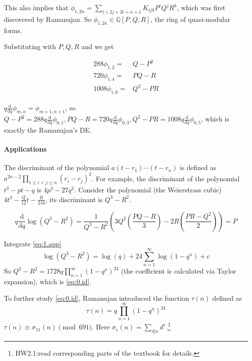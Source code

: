\documentclass{article}
\begin{document}
This also implies that $\phi_{1,2n} = \sum\limits_{i+2j+3l =n+1}^{}K_{ijk}P^iQ^jR^k$, which was first discovered by Ramanujan. So $\phi_{1,2n}\in \mathbb{Q}[P,Q,R]$, the ring of quasi-modular forms.

Substituting with $P,Q,R$ and we get

\begin{align*}
 288 \phi_{1,2} = & Q - P^2\\
 720\phi_{1,4} = & PQ-R\\
 1008 \phi_{1,6} = & Q^2 - PR
\end{align*}

$q \frac{\mathrm{d}}{\mathrm{d}q}\phi_{m,n} = \phi_{m+1,n+1}$, so $Q-P^2 = 288 q \frac{\mathrm{d}}{\mathrm{d}q}\phi_{0,1}, PQ-R = 720 q \frac{\mathrm{d}}{\mathrm{d}q}\phi_{0,3}, Q^2-PR=1008 q \frac{\mathrm{d}}{\mathrm{d}q}\phi_{0,5}$, which is exactly the Ramanujan's DE.

\paragraph{Applications}
The discriminant of the polynomial $a(t-r_1)\cdots (t-r_n)$ is defined as $a^{2n-2}\prod\limits_{1\leq i<j\leq n}(r_i-r_j)^2$. For example, the discriminant of the polynomial  $t^3 - pt - q$ is $4p^3-27q^2$. Consider the polynomial (the Weierstrass cubic) $4t^3 - \frac{Q}{12}t - \frac{R}{216}$, its discriminant is $Q^3-R^2$.

\begin{equation}
  \label{eq:1.app}
q \frac{\mathrm{d}}{\mathrm{d}q}\log(Q^3-R^2) = \frac{1}{Q^3-R^2} \left( 3Q^2 (\frac{PQ-R}{3}) - 2R (\frac{PR-Q^2}{2}) \right) = P
\end{equation}


Integrate \ref{eq:1.app}
\begin{equation}
\log(Q^3-R^2) = \log(q) + 24 \sum\limits_{n=1}^{\infty} \log(1-q^n) +c
\end{equation}
So $Q^3-R^2 = 1728q \prod\limits_{n=1}^{\infty} (1-q^n)^{24}$ (the coefficient is calculated via Taylor expansion), which is \ref{eq:0.id}.

To further study \ref{eq:0.id}, Ramanujan introduced the function $\tau(n)$ defined as
\begin{equation}
\tau(n)=q\prod_{n=1}^{\infty} (1-q^n)^{24}
\end{equation}
 $\tau(n) \equiv \sigma_{11}(n) \pmod{691}$. Here $\sigma_{r}(n) = \sum\limits_{d|n}^{}d^r$.\footnote{HW2.1:read corresponding parts of the textbook for details.}
\end{document}
